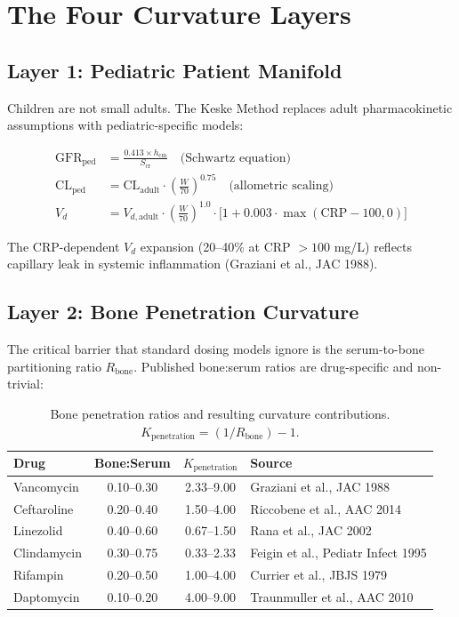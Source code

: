 \documentclass[11pt]{article}
\begin{document}
\section{The Four Curvature Layers}

\subsection{Layer 1: Pediatric Patient Manifold}

Children are not small adults. The Keske Method replaces adult pharmacokinetic
assumptions with pediatric-specific models:

\begin{align}
  \text{GFR}_{\text{ped}} &= \frac{0.413 \times h_{\text{cm}}}{S_{\text{cr}}} \quad
    \text{(Schwartz equation)} \\[4pt]
  \text{CL}_{\text{ped}} &= \text{CL}_{\text{adult}} \cdot
    \left(\frac{W}{70}\right)^{0.75} \quad
    \text{(allometric scaling)} \\[4pt]
  V_d &= V_{d,\text{adult}} \cdot \left(\frac{W}{70}\right)^{1.0}
    \cdot \bigl[1 + 0.003 \cdot \max(\text{CRP} - 100, 0)\bigr]
\end{align}

The CRP-dependent $V_d$ expansion (20--40\% at CRP $>100$ mg/L) reflects
capillary leak in systemic inflammation (Graziani et al., JAC 1988).

\subsection{Layer 2: Bone Penetration Curvature}

The critical barrier that standard dosing models ignore is the serum-to-bone
partitioning ratio $R_{\text{bone}}$. Published bone:serum ratios are
drug-specific and non-trivial:

\begin{table}[h!]
\centering
\small
\begin{tabular}{lccl}
\toprule
\textbf{Drug} & \textbf{Bone:Serum} & \textbf{$K_{\text{penetration}}$} & \textbf{Source} \\
\midrule
Vancomycin   & 0.10--0.30 & 2.33--9.00 & Graziani et al., JAC 1988 \\
Ceftaroline  & 0.20--0.40 & 1.50--4.00 & Riccobene et al., AAC 2014 \\
Linezolid    & 0.40--0.60 & 0.67--1.50 & Rana et al., JAC 2002 \\
Clindamycin  & 0.30--0.75 & 0.33--2.33 & Feigin et al., Pediatr Infect 1995 \\
Rifampin     & 0.20--0.50 & 1.00--4.00 & Currier et al., JBJS 1979 \\
Daptomycin   & 0.10--0.20 & 4.00--9.00 & Traunmuller et al., AAC 2010 \\
\bottomrule
\end{tabular}
\caption{Bone penetration ratios and resulting curvature contributions.
$K_{\text{penetration}} = (1/R_{\text{bone}}) - 1$.}
\end{table}
\end{document}
